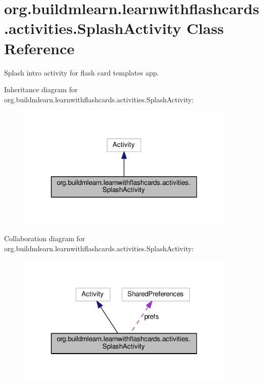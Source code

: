 \hypertarget{classorg_1_1buildmlearn_1_1learnwithflashcards_1_1activities_1_1SplashActivity}{}\section{org.\+buildmlearn.\+learnwithflashcards.\+activities.\+Splash\+Activity Class Reference}
\label{classorg_1_1buildmlearn_1_1learnwithflashcards_1_1activities_1_1SplashActivity}


Splash intro activity for flash card template\textquotesingle{}s app.  




Inheritance diagram for org.\+buildmlearn.\+learnwithflashcards.\+activities.\+Splash\+Activity\+:
\nopagebreak
\begin{figure}[H]
\begin{center}
\leavevmode
\includegraphics[width=295pt]{classorg_1_1buildmlearn_1_1learnwithflashcards_1_1activities_1_1SplashActivity__inherit__graph}
\end{center}
\end{figure}


Collaboration diagram for org.\+buildmlearn.\+learnwithflashcards.\+activities.\+Splash\+Activity\+:
\nopagebreak
\begin{figure}[H]
\begin{center}
\leavevmode
\includegraphics[width=295pt]{classorg_1_1buildmlearn_1_1learnwithflashcards_1_1activities_1_1SplashActivity__coll__graph}
\end{center}
\end{figure}
